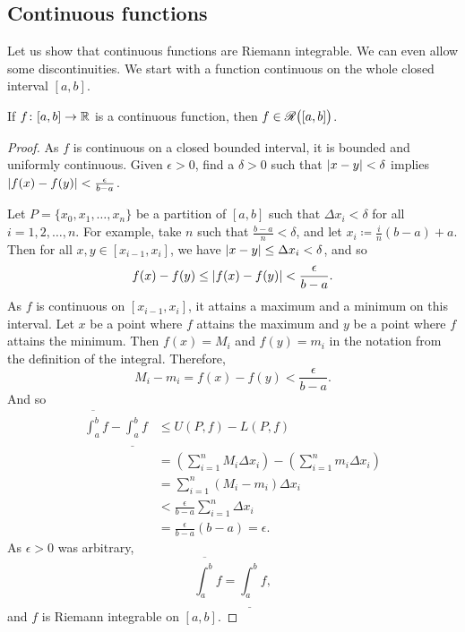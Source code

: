 \subsection{Continuous functions}

Let us show that continuous functions are Riemann integrable.
We can even allow some discontinuities.  We start with a
function continuous on the whole closed interval $[a,b]$.

\begin{lemma} \label{lemma:contint}
If $f \colon [a,b] \to {\mathbb{R}}$ is a continuous function,
then $f \in {\mathscr{R}}\bigl([a,b]\bigr)$.
\end{lemma}

\begin{proof}
As $f$ is continuous on a closed bounded interval, it is
bounded and
uniformly continuous.
Given $\epsilon > 0$, find a $\delta > 0$ such that
$\left\lvert {x-y} \right\rvert < \delta$ implies $\left\lvert {f(x)-f(y)} \right\rvert < \frac{\epsilon}{b-a}$.

Let $P = \{ x_0, x_1, \ldots, x_n \}$
be a partition of $[a,b]$ such that $\Delta x_i < \delta$ for all $i = 1,2,
\ldots, n$.  For example,
take $n$ such that $\frac{b-a}{n} < \delta$, and
let $x_i \coloneqq \frac{i}{n}(b-a) + a$.
Then for all $x, y \in [x_{i-1},x_i]$, we have 
$\left\lvert {x-y} \right\rvert \leq \Delta x_i < \delta$, and so
\begin{equation*}
f(x)-f(y) \leq \left\lvert {f(x)-f(y)} \right\rvert < \frac{\epsilon}{b-a} .
\end{equation*}
As $f$ is continuous on $[x_{i-1},x_i]$, it attains a maximum and a minimum
on this interval.
Let $x$ be a point where $f$ attains the maximum and $y$ be a point
where $f$ attains the minimum.  Then $f(x) = M_i$
and $f(y) = m_i$ in the notation from the definition of the integral.
Therefore,
\begin{equation*}
M_i-m_i = f(x)-f(y) < 
\frac{\epsilon}{b-a} .
\end{equation*}
And so
\begin{equation*}
\begin{split}
\overline{\int_a^b} f - 
\underline{\int_a^b} f 
& \leq
U(P,f) - L(P,f)
\\
& =
\left(
\sum_{i=1}^n
M_i \Delta x_i
\right)
-
\left(
\sum_{i=1}^n
m_i \Delta x_i
\right)
\\
& =
\sum_{i=1}^n
(M_i-m_i) \Delta x_i
\\
& <
\frac{\epsilon}{b-a}
\sum_{i=1}^n
\Delta x_i
\\
& =
\frac{\epsilon}{b-a} (b-a)
= \epsilon .
\end{split}
\end{equation*}
As $\epsilon > 0$ was arbitrary,
\begin{equation*}
\overline{\int_a^b} f = \underline{\int_a^b} f ,
\end{equation*}
and $f$ is Riemann integrable on $[a,b]$.
\end{proof}

